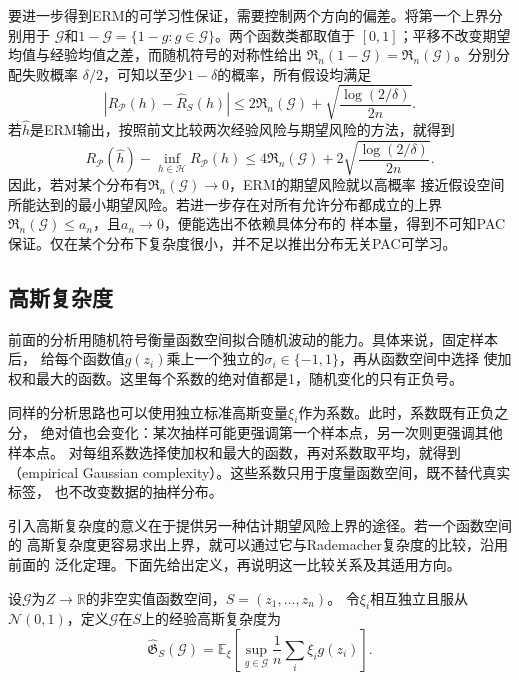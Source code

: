 要进一步得到ERM的可学习性保证，需要控制两个方向的偏差。将第一个上界分别用于
$\mathcal G$和$1-\mathcal G=\{1-g:g\in\mathcal G\}$。两个函数类都取值于
$[0,1]$；平移不改变期望均值与经验均值之差，而随机符号的对称性给出
$\mathfrak R_n(1-\mathcal G)=\mathfrak R_n(\mathcal G)$。分别分配失败概率
$\delta/2$，可知以至少$1-\delta$的概率，所有假设均满足
\[
 |R_{\mathcal P}(h)-\hat R_S(h)|
 \leq2\mathfrak R_n(\mathcal G)+\sqrt{\frac{\log(2/\delta)}{2n}}.
\]
若$\hat h$是ERM输出，按照前文比较两次经验风险与期望风险的方法，就得到
\begin{equation}
 R_{\mathcal P}(\hat h)-\inf_{h\in\mathcal H}R_{\mathcal P}(h)
 \leq4\mathfrak R_n(\mathcal G)
 +2\sqrt{\frac{\log(2/\delta)}{2n}}.
 \label{eq:rademacher-excess-risk}
\end{equation}
因此，若对某个分布有$\mathfrak R_n(\mathcal G)\to0$，ERM的期望风险就以高概率
接近假设空间所能达到的最小期望风险。若进一步存在对所有允许分布都成立的上界
$\mathfrak R_n(\mathcal G)\leq a_n$，且$a_n\to0$，便能选出不依赖具体分布的
样本量，得到不可知PAC保证。仅在某个分布下复杂度很小，并不足以推出分布无关PAC可学习。

\subsection{高斯复杂度}

前面的分析用随机符号衡量函数空间拟合随机波动的能力。具体来说，固定样本后，
给每个函数值$g(z_i)$乘上一个独立的$\sigma_i\in\{-1,1\}$，再从函数空间中选择
使加权和最大的函数。这里每个系数的绝对值都是1，随机变化的只有正负号。

同样的分析思路也可以使用独立标准高斯变量$\xi_i$作为系数。此时，系数既有正负之分，
绝对值也会变化：某次抽样可能更强调第一个样本点，另一次则更强调其他样本点。
对每组系数选择使加权和最大的函数，再对系数取平均，就得到
（empirical Gaussian complexity）。这些系数只用于度量函数空间，既不替代真实标签，
也不改变数据的抽样分布。

引入高斯复杂度的意义在于提供另一种估计期望风险上界的途径。若一个函数空间的
高斯复杂度更容易求出上界，就可以通过它与Rademacher复杂度的比较，沿用前面的
泛化定理。下面先给出定义，再说明这一比较关系及其适用方向。

\begin{definition}[经验高斯复杂度]
\label{def:gaussian-complexity}
设$\mathcal G$为$Z\to\mathbb R$的非空实值函数空间，$S=(z_1,\ldots,z_n)$。
令$\xi_i$相互独立且服从$\mathcal N(0,1)$，定义$\mathcal G$在$S$上的经验高斯复杂度为
\[
 \widehat{\mathfrak G}_S(\mathcal G)
 =\mathbb E_\xi\left[\sup_{g\in\mathcal G}\frac1n\sum_i \xi_i g(z_i)\right].
\]
\end{definition}

